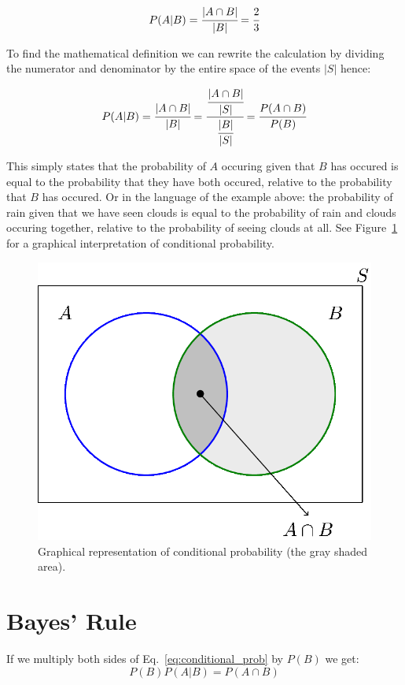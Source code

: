 \begin{equation}
P(A|B) = \cfrac{|A\cap B|}{|B|} = \cfrac{2}{3}
\end{equation}

To find the mathematical definition we can rewrite the calculation by dividing the numerator and denominator by the entire space of the events $|S|$ hence:

\begin{equation}
  P(A|B) = \cfrac{|A\cap B|}{|B|} = \cfrac{\cfrac{|A\cap B|}{|S|}}{\cfrac{|B|}{|S|}} = \cfrac{P(A\cap B)}{P(B)}
  \label{eq:conditional_prob}
\end{equation}

This simply states that the probability of $A$ occuring given that $B$ has occured is equal to the probability that they have both occured, relative to the probability that $B$ has occured.
Or in the language of the example above: the probability of rain given that we have seen clouds is equal to the probability of rain and clouds occuring together, relative to the probability of seeing clouds at all.
See Figure~\ref{fig:conditional_prob} for a graphical interpretation of conditional probability.

\begin{figure}[tb]
  \centering
  \includegraphics[width=0.5\linewidth]{figures/conditional_b}
  \caption{Graphical representation of conditional probability (the gray shaded area).}
  \label{fig:conditional_prob}
\end{figure}

\section{Bayes' Rule}

If we multiply both sides of Eq.~\ref{eq:conditional_prob} by $P(B)$ we get:
\begin{equation}
P(B)P(A|B)=P(A\cap B)
\end{equation}

